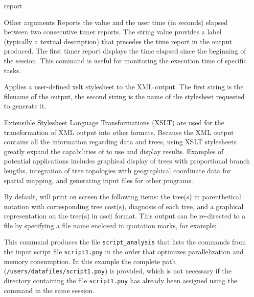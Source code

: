 \begin{command}{report}{}
\begin{arguments}
\begin{argumentgroup}{Other arguments}
{Reports the value and the user time (in seconds) elapsed between
two consecutive timer reports. The string value provides a label
(typically a textual description) that precedes the time report
in the output produced.
The first timer report displays the time elapsed since the beginning of the
\poy session. This command is useful for monitoring the execution time
of specific tasks.}
{}

{Applies a user-defined xslt stylesheet to the XML output. The first string is
the filename of the output, the second string is the name of the stylesheet
requested to generate it.}
{}


\begin{statement}
Extensible Stylesheet Language Transformations (XSLT) are used
for the transformation of XML output into other formats. Because the XML 
output contains all the information regarding data and trees, using XSLT 
stylesheets greatly expand the capabilities of \poy to use and display results.
Examples of potential applications includes graphical display of trees with 
proportional branch lengths, integration of tree topologies with geographical 
coordinate data for spatial mapping, and generating input files for other programs.
\end{statement}

\end{argumentgroup}
\end{arguments}

{By default, \poy will print on screen the following items: the tree(s)
in parenthetical notation with corresponding tree cost(s), diagnosis of
each tree, and a graphical representation on the tree(s) in ascii
format. This output can be re-directed to a file by specifying a file
name enclosed in quotation marks, for example:
.}

\begin{poyexamples} 

{This command produces the file \texttt{script\_analysis} that lists the commands from
the input script file \texttt{script1.poy} in the order that optimizes parallelization and
memory consumption. In this example the complete path (\texttt{/users/datafiles/script1.poy})
is provided, which is not necessary if the directory containing the file \texttt{script1.poy}
has already been assigned using the command  in the same \poy session.}


\end{poyexamples}
\end{command}
